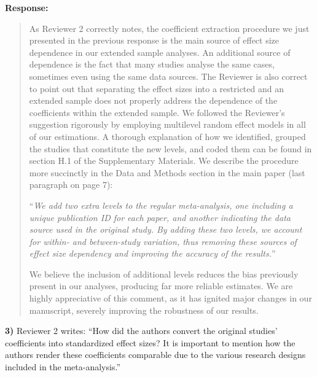 \documentclass[a4paper,12pt]{article}
\begin{document}
\vspace{.3cm}

\noindent \textbf{Response:} 
\begin{quote}
    As Reviewer 2 correctly notes, the coefficient extraction procedure we just presented in the previous response is the main source of effect size dependence in our extended sample analyses. An additional source of dependence is the fact that many studies analyse the same cases, sometimes even using the same data sources. The Reviewer is also correct to point out that separating the effect sizes into a restricted and an extended sample does not properly address the dependence of the coefficients within the extended sample. We followed the Reviewer's suggestion rigorously by employing multilevel random effect models \citep{cheung2014modeling, matthes2019meta} in all of our estimations. A thorough explanation of how we identified, grouped the studies that constitute the new levels, and coded them can be found in section H.1 of the Supplementary Materials. We describe the procedure more succinctly in the Data and Methods section in the main paper (last paragraph on page 7):
    
    ``\textit{We add two extra levels to the regular meta-analysis, one including a unique publication ID for each paper, and another indicating the data source used in the original study. By adding these two levels, we account for within- and between-study variation, thus removing these sources of effect size dependency and improving the accuracy of the results.}''
    
    We believe the inclusion of additional levels reduces the bias previously present in our analyses, producing far more reliable estimates. We are highly appreciative of this comment, as it has ignited major changes in our manuscript, severely improving the robustness of our results. 
\end{quote}

\vspace{.3cm}

\noindent \textbf{3)} Reviewer 2 writes: ``How did the authors convert the original studies' coefficients into standardized effect sizes? It is important to mention how the authors render these coefficients comparable due to the various research designs included in the meta-analysis.''

\vspace{.3cm}
\end{document}
